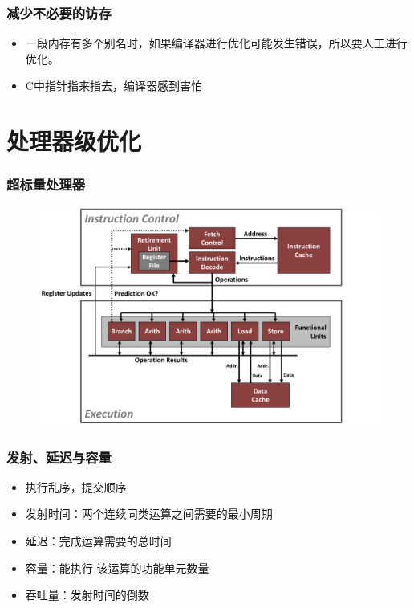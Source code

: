 \documentclass[12pt,AutoFakeBold,aspectratio=43,mathserif]{beamer}
\begin{document}
{\begin{frame}
    \end{frame}

    \begin{frame}
        \frametitle{减少不必要的访存}

        \begin{itemize}
            \item 一段内存有多个别名时，如果编译器进行优化可能发生错误，所以要人工进行优化。
            \item C中指针指来指去，编译器感到害怕
        \end{itemize}

    \end{frame}

    \section{处理器级优化}

    \begin{frame}
        \frametitle{超标量处理器}

        \begin{figure}
            \includegraphics[width=\textwidth]{figures/8.png}
        \end{figure}
    
    \end{frame}

    \begin{frame}
        \frametitle{发射、延迟与容量}
    
        \begin{itemize}
            \item 执行乱序，提交顺序
            \item 发射时间：两个连续同类运算之间需要的最小周期
            \item 延迟：完成运算需要的总时间
            \item 容量：能执行 该运算的功能单元数量
            \item 吞吐量：发射时间的倒数
        \end{itemize}


\end{frame}}
\end{document}
